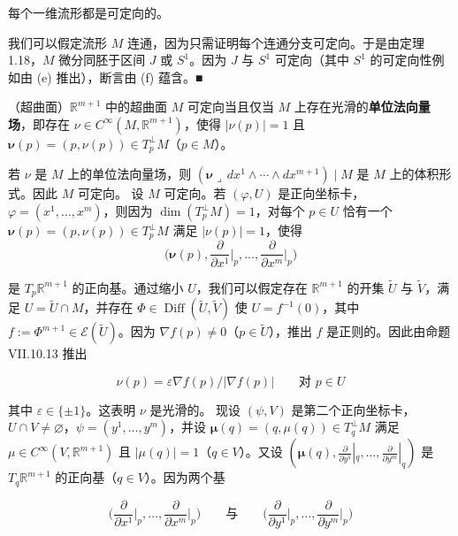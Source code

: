 \begin{example}
\begin{items}
每个一维流形都是可定向的。

\proofhead
我们可以假定流形 $ M $ 连通，因为只需证明每个连通分支可定向。于是由定理 1.18，$ M $ 微分同胚于区间 $ J $ 或 $ S^{1} $。因为 $ J $ 与 $ S^{1} $ 可定向（其中 $ S^{1} $ 的可定向性例如由 (e) 推出），断言由 (f) 蕴含。\nobreak\hspace{0.35em}■
\item

（超曲面）$ \mathbb{R}^{m+1} $ 中的超曲面 $ M $ 可定向当且仅当 $ M $ 上存在光滑的\textbf{单位法向量场}，即存在 $ \nu \in C^{\infty}(M, \mathbb{R}^{m+1}) $，使得 $ |\nu(p)| = 1 $ 且 $ \boldsymbol{\nu}(p) = (p, \nu(p)) \in T_{p}^{\perp}M $（$ p \in M $）。

\proofhead
若 $ \nu $ 是 $ M $ 上的单位法向量场，则 $ (\boldsymbol{\nu} \lrcorner\, dx^{1} \wedge \cdots \wedge dx^{m+1}) \mid M $ 是 $ M $ 上的体积形式。因此 $ M $ 可定向。
设 $ M $ 可定向。若 $ (\varphi, U) $ 是正向坐标卡，$ \varphi = (x^{1}, \ldots, x^{m}) $，则因为 $ \dim(T_{p}^{\perp}M) = 1 $，对每个 $ p \in U $ 恰有一个 $ \boldsymbol{\nu}(p) = (p, \nu(p)) \in T_{p}^{\perp}M $ 满足 $ |\nu(p)| = 1 $，使得
\[
\big( \boldsymbol{\nu}(p), \frac{\partial}{\partial x^{1}}\big|_p, \ldots, \frac{\partial}{\partial x^{m}}\big|_p \big)
\]

是 $ T_{p}\mathbb{R}^{m+1} $ 的正向基。通过缩小 $ U $，我们可以假定存在 $ \mathbb{R}^{m+1} $ 的开集 $ \widetilde{U} $ 与 $ \widetilde{V} $，满足 $ U = \widetilde{U} \cap M $，并存在 $ \Phi \in \operatorname{Diff}(\widetilde{U}, \widetilde{V}) $ 使 $ U = f^{-1}(0) $，其中 $ f := \Phi^{m+1} \in \mathcal{E}(\widetilde{U}) $。因为 $ \nabla f(p) \neq 0 $（$ p \in \widetilde{U} $），推出 $ f $ 是正则的。因此由命题 VII.10.13 推出

\[
\nu(p) = \varepsilon \nabla f(p)/|\nabla f(p)| \qquad \text{对 } p \in U
\]

其中 $ \varepsilon \in \{ \pm 1 \} $。这表明 $ \nu $ 是光滑的。
现设 $ (\psi, V) $ 是第二个正向坐标卡，$ U \cap V \neq \varnothing $，$ \psi = (y^{1}, \ldots, y^{m}) $，并设 $ \boldsymbol{\mu}(q) = (q, \mu(q)) \in T_{q}^{\perp}M $ 满足 $ \mu \in C^{\infty}(V, \mathbb{R}^{m+1}) $ 且 $ |\mu(q)| = 1 $（$ q \in V $）。又设 $ (\boldsymbol{\mu}(q), \frac{\partial}{\partial y^{1}}|_q, \ldots, \frac{\partial}{\partial y^{m}}|_q) $ 是 $ T_{q}\mathbb{R}^{m+1} $ 的正向基（$ q \in V $）。因为两个基

\[
\big( \frac{\partial}{\partial x^{1}}\big|_p, \ldots, \frac{\partial}{\partial x^{m}}\big|_p \big) \qquad \text{与} \qquad \big( \frac{\partial}{\partial y^{1}}\big|_p, \ldots, \frac{\partial}{\partial y^{m}}\big|_p \big)
\]


\end{items}
\end{example}
